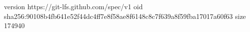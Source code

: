 version https://git-lfs.github.com/spec/v1
oid sha256:90108b4fb641e52f44dc4ff7e8f58ae8f6148c8c7f639a8f59fba17017a60f63
size 174940
